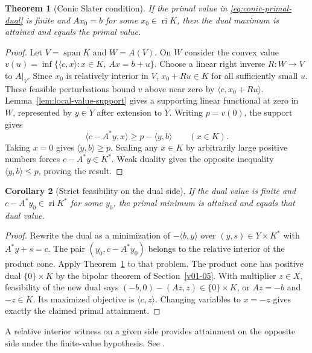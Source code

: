 \documentclass[11pt,oneside,openany]{book}
\theoremstyle{plain}
\newtheorem{theorem}{Theorem}[chapter]
\newtheorem{corollary}[theorem]{Corollary}
\theoremstyle{definition}
\theoremstyle{remark}
\begin{document}
\begin{theorem}[Conic Slater condition]\label{thm:conic-slater}
If the primal value in \eqref{eq:conic-primal-dual}
is finite and \(Ax_0=b\) for some
\(x_0\in\operatorname{ri}K\), then the dual maximum
is attained and equals the primal value.
\end{theorem}

\begin{proof}
Let \(V=\operatorname{span}K\) and \(W=A(V)\).
On \(W\) consider the convex value
\(v(u)=\inf\{\langle c,x\rangle:x\in K,\ Ax=b+u\}\).
Choose a linear right inverse \(R:W\to V\) to \(A|_V\).
Since \(x_0\) is relatively interior in \(V\),
\(x_0+Ru\in K\) for all sufficiently small \(u\).
These feasible perturbations bound \(v\) above
near zero by \(\langle c,x_0+Ru\rangle\).
Lemma~\ref{lem:local-value-support} gives a supporting
linear functional at zero in \(W\), represented by
\(y\in Y\) after extension to \(Y\).
Writing \(p=v(0)\), the support gives
\[
 \langle c-A^*y,x\rangle\ge p-\langle y,b\rangle
 \qquad(x\in K).
\]
Taking \(x=0\) gives \(\langle y,b\rangle\ge p\).
Scaling any \(x\in K\) by arbitrarily large
positive numbers forces \(c-A^*y\in K^*\).
Weak duality gives the opposite inequality
\(\langle y,b\rangle\le p\), proving the result.
\end{proof}

\begin{corollary}[Strict feasibility on the dual side]\label{cor:dual-slater}
If the dual value is finite and \(c-A^*y_0\in
\operatorname{ri}K^*\) for some \(y_0\), the primal
minimum is attained and equals that dual value.
\end{corollary}

\begin{proof}
Rewrite the dual as a minimization of
\(-\langle b,y\rangle\) over
\((y,s)\in Y\times K^*\) with \(A^*y+s=c\).
The pair \((y_0,c-A^*y_0)\) belongs to the
relative interior of the product cone.
Apply Theorem~\ref{thm:conic-slater} to that problem.
The product cone has positive dual \(\{0\}\times K\)
by the bipolar theorem of Section~\ref{v01-05}.
With multiplier \(z\in X\), feasibility of the
new dual says
\((-b,0)-(Az,z)\in\{0\}\times K\), or \(Az=-b\)
and \(-z\in K\). Its maximized objective is
\(\langle c,z\rangle\). Changing variables to
\(x=-z\) gives exactly the claimed primal attainment.
\end{proof}

A relative interior witness on a given side provides
attainment on the opposite side under the finite-value
hypothesis. See \cite[Section 5.9]{Boyd}.
\end{document}
